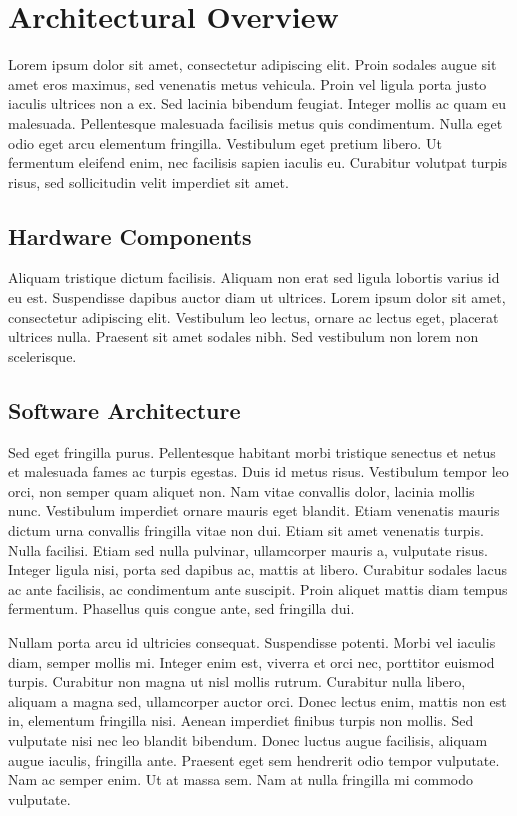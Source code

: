 \chapter{Architectural Overview}
\label{chp:b3}

Lorem ipsum dolor sit amet, consectetur adipiscing elit. Proin sodales augue
sit amet eros maximus, sed venenatis metus vehicula. Proin vel ligula porta
justo iaculis ultrices non a ex. Sed lacinia bibendum feugiat. Integer mollis
ac quam eu malesuada. Pellentesque malesuada facilisis metus quis condimentum.
Nulla eget odio eget arcu elementum fringilla. Vestibulum eget pretium libero.
Ut fermentum eleifend enim, nec facilisis sapien iaculis eu. Curabitur volutpat
turpis risus, sed sollicitudin velit imperdiet sit amet.

\section{Hardware Components}

Aliquam tristique dictum facilisis. Aliquam non erat sed ligula lobortis varius
id eu est. Suspendisse dapibus auctor diam ut ultrices. Lorem ipsum dolor sit
amet, consectetur adipiscing elit. Vestibulum leo lectus, ornare ac lectus
eget, placerat ultrices nulla. Praesent sit amet sodales nibh. Sed vestibulum
non lorem non scelerisque.

\section{Software Architecture}
Sed eget fringilla purus. Pellentesque habitant morbi tristique senectus et
netus et malesuada fames ac turpis egestas. Duis id metus risus. Vestibulum
tempor leo orci, non semper quam aliquet non. Nam vitae convallis dolor,
lacinia mollis nunc. Vestibulum imperdiet ornare mauris eget blandit. Etiam
venenatis mauris dictum urna convallis fringilla vitae non dui. Etiam sit amet
venenatis turpis. Nulla facilisi. Etiam sed nulla pulvinar, ullamcorper mauris
a, vulputate risus. Integer ligula nisi, porta sed dapibus ac, mattis at
libero. Curabitur sodales lacus ac ante facilisis, ac condimentum ante
suscipit. Proin aliquet mattis diam tempus fermentum. Phasellus quis congue
ante, sed fringilla dui.

Nullam porta arcu id ultricies consequat. Suspendisse potenti. Morbi vel
iaculis diam, semper mollis mi. Integer enim est, viverra et orci nec,
porttitor euismod turpis. Curabitur non magna ut nisl mollis rutrum. Curabitur
nulla libero, aliquam a magna sed, ullamcorper auctor orci. Donec lectus enim,
mattis non est in, elementum fringilla nisi. Aenean imperdiet finibus turpis
non mollis. Sed vulputate nisi nec leo blandit bibendum. Donec luctus augue
facilisis, aliquam augue iaculis, fringilla ante. Praesent eget sem hendrerit
odio tempor vulputate. Nam ac semper enim. Ut at massa sem. Nam at nulla
fringilla mi commodo vulputate.

